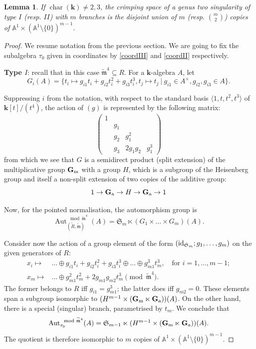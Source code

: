 \documentclass{compositio}
\renewcommand{\k}{\mathbf k}
\newcommand{\tR}{\widetilde{R}}
\newcommand{\tm}{\widetilde{\mathfrak m}}
\renewcommand{\to}{\rightarrow}
\newcommand{\Aaff}{\mathbb A}
\newcommand{\Gm}{\mathbb{G}_{\rm{m}}}
\newcommand{\Ga}{\mathbb{G}_{\rm{a}}}
\newcommand{\Aut}{\operatorname{Aut}}
\newcommand{\id}{{\rm id}}
\theoremstyle{plain}
\newtheorem{lem}[thm]{Lemma}
\theoremstyle{definition}
\theoremstyle{remark}
\begin{document}
\begin{lem}\label{lem:crimping}
 If $\operatorname{char}(\k)\neq2,3$, the crimping space of a genus two singularity of type $I$ (resp. $I\!I$) with $m$ branches is the disjoint union of $m$ (resp. ${m}\choose{2}$) copies of $\Aaff^1\times(\Aaff^1\setminus\{0\})^{m-1}$.
\end{lem}
\begin{proof}
We resume notation from the previous section. We are going to fix the subalgebra $\tau_0$ given in coordinates by \eqref{coordIII} and \eqref{coordII} respectively.

\textbf{Type $I$}: recall that in this case $\tm^4\subseteq R$. For a $\k$-algebra $A$, let
\[G_i(A)=\{t_i\mapsto g_{i1}t_i+g_{i2}t_i^2+g_{i3}t_i^3,t_j\mapsto t_j\ |\ g_{i1}\in A^\times,g_{i2},g_{i3}\in A\}.\]

Suppressing $i$ from the notation, with respect to the standard basis $\langle 1,t,t^2,t^3\rangle$ of $\k[t]/(t^4)$, the action of $(g)$ is represented by the following matrix:
\begin{equation*}
\begin{pmatrix}
1 & {} & {} & {} \\
{} & g_1 & {} & {} \\
{} & g_2  & g_1^2  & {}  \\
{} & g_3 & 2g_1g_2 & g_1^3
\end{pmatrix}
\end{equation*}
from which we see that $G$ is a semidirect product (split extension) of the multiplicative group $\Gm$ with a group $H$, which is a subgroup of the Heisenberg group and itself a non-split extension of two copies of the additive group:
\[1\to \Ga\to H\to \Ga\to 1\]

Now, for the pointed normalisation, the automorphism group is
\[\Aut_{(\tR,\tm)}^{\mod\tm^4}(A)= \mathfrak{S}_m \ltimes (G_1\times\ldots\times G_m)(A).\]

Consider now the action of a group element of the form $(\id_{\mathfrak{S}_m};g_1,\ldots,g_m)$ on the given generators of $R$:
\begin{align*}
 x_i\mapsto& \ldots\oplus g_{i1}t_i+g_{i2}t_i^2+g_{i3}t_i^3\oplus\ldots\oplus g_{m1}^3t_m^3,\quad\text{for } i=1,\ldots,m-1;\\
 x_m\mapsto& \ldots\oplus g_{m1}^2t_m^2+2g_{m1}g_{m2}t_m^3 \pmod{\tm^4}.
\end{align*}
The former belongs to $R$ iff $g_{i1}=g_{m1}^3$; the latter does iff $g_{m2}=0$. These elements span a subgroup isomorphic to $(H^{m-1}\times(\Gm\ltimes\Ga))(A)$. On the other hand, there is a special (singular) branch, parametrised by $t_m$. We conclude that
\[\Aut_{\tau_0}^{\mod\tm^4}(A)=\mathfrak{S}_{m-1}\ltimes(H^{m-1}\times(\Gm\ltimes\Ga))(A).\]
The quotient is therefore isomorphic to $m$ copies of $\Aaff^1\times(\Aaff^1\setminus\{0\})^{m-1}$. 


\end{proof}
\end{document}
